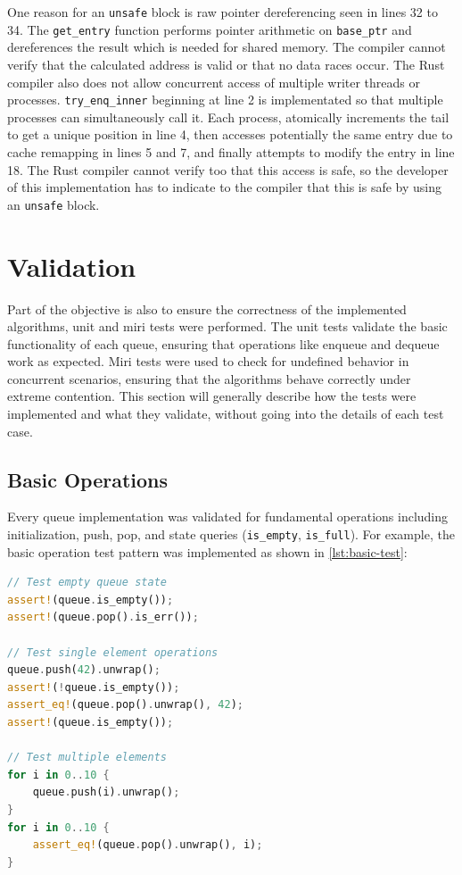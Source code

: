 One reason for an \texttt{unsafe} block is raw pointer dereferencing seen in lines 32 to 34. The \texttt{get\_entry} function performs pointer arithmetic on \texttt{base\_ptr} and dereferences the result which is needed for shared memory. The compiler cannot verify that the calculated address is valid or that no data races occur. The Rust compiler also does not allow concurrent access of multiple writer threads or processes. \texttt{try\_enq\_inner} beginning at line 2 is implementated so that multiple processes can simultaneously call it. Each process, atomically increments the tail to get a unique position in line 4, then accesses potentially the same entry due to cache remapping in lines 5 and 7, and finally attempts to modify the entry in line 18. The Rust compiler cannot verify too that this access is safe, so the developer of this implementation has to indicate to the compiler that this is safe by using an \texttt{unsafe} block.

\section{Validation}
Part of the objective is also to ensure the correctness of the implemented algorithms, unit and miri tests were performed. The unit tests validate the basic functionality of each queue, ensuring that operations like enqueue and dequeue work as expected. Miri tests were used to check for undefined behavior in concurrent scenarios, ensuring that the algorithms behave correctly under extreme contention. This section will generally describe how the tests were implemented and what they validate, without going into the details of each test case.

\subsection{Basic Operations}
Every queue implementation was validated for fundamental operations including initialization, push, pop, and state queries (\texttt{is\_empty}, \texttt{is\_full}). For example, the basic operation test pattern was implemented as shown in \cref{lst:basic-test}:

\begin{lstlisting}[language=Rust, style=boxed, caption={Basic operation test pattern}, label={lst:basic-test}]
// Test empty queue state
assert!(queue.is_empty());
assert!(queue.pop().is_err());

// Test single element operations
queue.push(42).unwrap();
assert!(!queue.is_empty());
assert_eq!(queue.pop().unwrap(), 42);
assert!(queue.is_empty());

// Test multiple elements
for i in 0..10 {
    queue.push(i).unwrap();
}
for i in 0..10 {
    assert_eq!(queue.pop().unwrap(), i);
}
\end{lstlisting}

